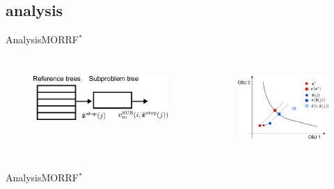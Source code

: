 \subsection{analysis}

\begin{frame}{Analysis}{MORRF$^{*}$}
\begin{columns}
	\begin{figure}
		\centering
		\includegraphics[width=\linewidth]{figure/cascade}
		\label{fig:morrt:cascade}
	\end{figure}
	\begin{figure}
		\centering
		\includegraphics[width=\linewidth]{figure/conv}
		\label{fig:morrt:conv}
	\end{figure}
\end{columns}
\end{frame}

\begin{frame}{Analysis}{MORRF$^{*}$}

\end{frame}